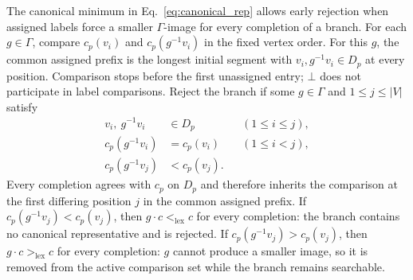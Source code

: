 The canonical minimum in Eq.~\ref{eq:canonical_rep} allows early rejection when assigned labels force a smaller $\Gamma$-image for every completion of a branch.
For each $g\in\Gamma$, compare $c_p(v_i)$ and $c_p(g^{-1}v_i)$ in the fixed vertex order. For this $g$, the common assigned prefix is the longest initial segment with $v_i,g^{-1}v_i\in D_p$ at every position. Comparison stops before the first unassigned entry; $\bot$ does not participate in label comparisons. Reject the branch if some $g\in\Gamma$ and $1\leq j\leq |V|$ satisfy%
\begin{equation}
\begin{aligned}
v_i,\ g^{-1}v_i&\in D_p &&(1\leq i\leq j),\\
c_p(g^{-1}v_i)&=c_p(v_i) &&(1\leq i<j),\\
c_p(g^{-1}v_j)&<c_p(v_j).
\end{aligned}
\label{eq:prefix_rejection}
\end{equation}
Every completion agrees with $c_p$ on $D_p$ and therefore inherits the comparison at the first differing position $j$ in the common assigned prefix. If $c_p(g^{-1}v_j)<c_p(v_j)$, then $g\cdot c<_{\mathrm{lex}}c$ for every completion: the branch contains no canonical representative and is rejected. If $c_p(g^{-1}v_j)>c_p(v_j)$, then $g\cdot c>_{\mathrm{lex}}c$ for every completion: $g$ cannot produce a smaller image, so it is removed from the active comparison set while the branch remains searchable.

